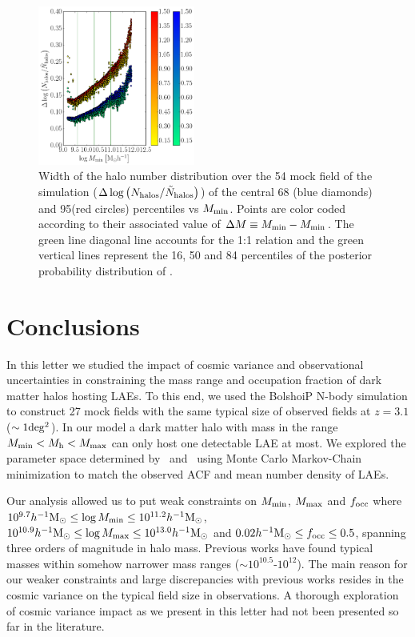 \documentclass{emulateapj}
\newcommand{\hMsun}{{\ifmmode{h^{-1}{\rm {M_{\odot}}}}\else{$h^{-1}{\rm{M_{\odot}}}$}\fi}}
\newcommand{\mmin}{{\ifmmode{{M_{\rm min}}}\else{${M_{\rm min}}$}\fi}}
\newcommand{\mmax}{{\ifmmode{{M_{\rm max}}}\else{${M_{\rm max}}$}\fi}}
\begin{document}
\begin{figure}
\includegraphics[width=0.46\textwidth, height=0.33\textwidth]{mmin_dfocc1.png}
\caption{Width of the halo number distribution over the 54 mock field of the simulation ($\Delta \log \left( N_{\rm halos}/\tilde{N}_{\rm halos}\right)$) of the central 68 (blue diamonds) and  95(red circles)  percentiles vs $M_{\rm min}$. Points are color coded according to their associated value of $\Delta M \equiv M_{\rm min}-M_{\rm min}$. The green line diagonal line accounts for the 1:1 relation and the green vertical lines represent  the 16, 50 and 84 percentiles  of the posterior probability distribution of \mmin.}
\label{fig:cosmicv}
\end{figure}


\section{Conclusions}

In this letter we studied the impact of cosmic variance and observational uncertainties in constraining the mass range and  occupation fraction of dark matter halos hosting  LAEs.  
To this end, we used the BolshoiP N-body simulation to construct  27 mock fields  with the same typical size  of observed fields at  $z=3.1$ ($\sim 1 {\rm deg^2}$).  
In our model a dark matter halo with mass in the range $M_{\rm min}<M_{\rm h}<M_{\rm   max}$ can only host one detectable LAE at most. 
We explored the parameter space determined by \mmin\ and \mmax\ using Monte Carlo Markov-Chain minimization to match the observed  ACF and mean number density of LAEs. 

Our analysis allowed us to put weak constraints on $M_{\rm min}$, $M_{\rm max}$ and $f_{\rm occ}$ where $10^{9.7}\hMsun\leq \log M_{\rm min}\leq 10^{11.2}\hMsun$, $10^{10.9}\hMsun\leq \log M_{\rm max}\leq 10^{13.0}\hMsun$ and $0.02\hMsun\leq f_{\rm occ}\leq 0.5$, spanning three orders of magnitude in halo mass.
Previous works\citep{Hayashino2004, Gawiser07,Ouchi2008,Bielby16} have found typical masses within somehow narrower mass ranges ($\sim 10^{10.5}$-$10^{12}$).  
The main reason for our weaker constraints and large discrepancies with previous works resides in the cosmic variance on the typical field size in observations. 
A thorough exploration of cosmic variance impact as we present in this letter had not been presented so far in the literature.
\end{document}
